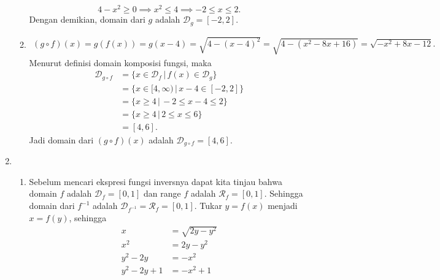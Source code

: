 \documentclass[11pt,openany,a4paper]{article}
\begin{document}
\begin{enumerate}
\begin{enumerate}
                    \[
                        4 - x^2 \geq 0 \implies x^2 \leq 4 \implies -2 \leq x \leq 2.
                    \]
                    Dengan demikian, domain dari $g$ adalah $\mathcal{D}_g = [-2,2]$.
              \item \begin{align*}
                        (g \circ f)(x)  = g(f(x))
                        = g(x - 4)
                        = \sqrt{4 - (x - 4)^2}
                        = \sqrt{4 - (x^2 - 8x + 16)}
                        = \sqrt{-x^2 + 8x - 12}.
                    \end{align*}
                    Menurut definisi domain komposisi fungsi, maka
                    \begin{align*}
                        \mathcal{D}_{g \circ f} & = \{x \in \mathcal{D}_f \,|\, f(x) \in \mathcal{D}_g\} \\
                                                & = \{x \in [4,\infty) \,|\, x - 4 \in [-2,2]\}          \\
                                                & = \{x \geq 4 \,|\, -2 \leq x - 4 \leq 2\}              \\
                                                & = \{x \geq 4 \,|\, 2 \leq x \leq 6\}                   \\
                                                & = [4,6].
                    \end{align*}
                    Jadi domain dari $(g \circ f)(x)$ adalah $\mathcal{D}_{
                            g \circ f
                        } = [4,6]$.
          \end{enumerate}
    \item \begin{enumerate}
              \item Sebelum mencari ekspresi fungsi inversnya dapat kita tinjau bahwa domain $f$ adalah $\mathcal{D}_f = [0,1]$ dan range $f$ adalah $\mathcal{R}_f = [0,1]$. Sehingga domain dari $f^{-1}$ adalah $\mathcal{D}_{f^{-1}} = \mathcal{R}_f = [0,1]$.
                    Tukar $y = f(x)$ menjadi $x = f(y)$, sehingga
                    \begin{align*}
                        x            & = \sqrt{2y - y^2}      \\
                        x^2          & = 2y - y^2             \\
                        y^2 - 2y     & = -x^2                 \\
                        y^2 - 2y + 1 & = -x^2 + 1             \\

\end{align*}
\end{enumerate}
\end{enumerate}
\end{document}
